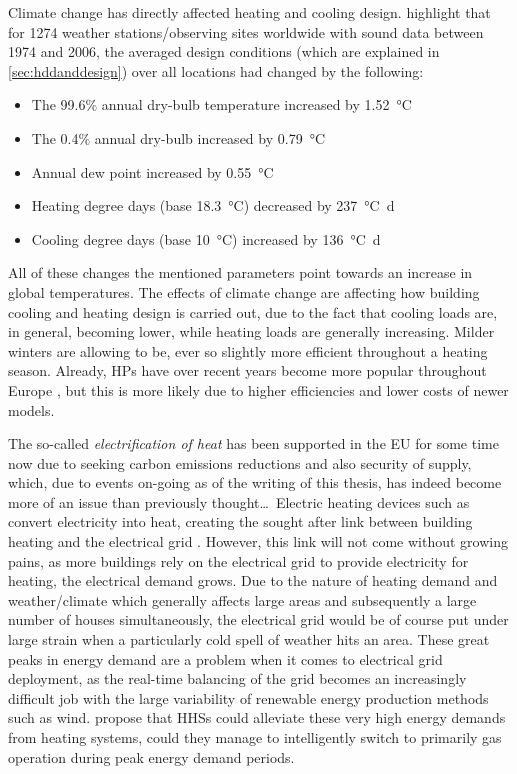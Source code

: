 Climate change has directly affected heating and cooling design.  highlight that for \num{1274} weather stations/observing sites worldwide with sound data between 1974 and 2006, the averaged design conditions (which are explained in \cref{sec:hddanddesign}) over all locations had changed by the following:
\begin{itemize}
    \item The 99.6\% annual dry-bulb temperature increased by \SI{1.52}{\celsius}
    \item The 0.4\% annual dry-bulb increased by \SI{0.79}{\celsius} 
    \item Annual dew point increased by \SI{0.55}{\celsius} 
    \item Heating degree days (base \SI{18.3}{\celsius}) decreased by \SI{237}{\celsius\day} 
    \item Cooling degree days (base \SI{10}{\celsius}) increased by \SI{136}{\celsius\day}
\end{itemize}
All of these changes the mentioned parameters point towards an increase in global temperatures. The effects of climate change are affecting how building cooling and heating design is carried out, due to the fact that cooling loads are, in general, becoming lower, while heating loads are generally increasing. Milder winters are allowing \HPs to be, ever so slightly more efficient throughout a heating season. Already, \acp{HP} have over recent years become more popular throughout Europe \cite{ehpa_2015,nowak_2018}, but this is more likely due to higher efficiencies and lower costs of newer models.


The so-called \textit{electrification of heat} has been supported in the EU for some time now due to seeking carbon emissions reductions and also security of supply, which, due to events on-going as of the writing of this thesis, has indeed become more of an issue than previously thought\ldots\ Electric heating devices such as \HPs convert electricity into heat, creating the sought after link between building heating and the electrical grid \cite{heinen_electricity_2016}. However, this link will not come without growing pains, as more buildings rely on the electrical grid to provide electricity for heating, the electrical demand grows. Due to the nature of heating demand and weather/climate which generally affects large areas and subsequently a large number of houses simultaneously, the electrical grid would be of course put under large strain when a particularly cold spell of weather hits an area. These great peaks in energy demand are a problem when it comes to electrical grid deployment, as the real-time balancing of the grid becomes an increasingly difficult job with the large variability of renewable energy production methods such as wind. \citeauthor {vuillecard_small_2011, thomasen_decarbonisation_2021} \cite{vuillecard_small_2011, thomasen_decarbonisation_2021} propose that \acp{HHS} could alleviate these very high energy demands from heating systems, could they manage to intelligently switch to primarily gas operation during peak energy demand periods. 


